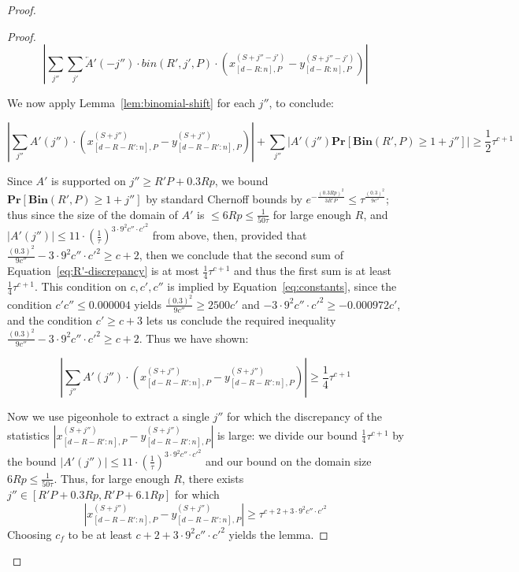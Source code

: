 \documentclass[11pt]{article}
\theoremstyle{plain}
\newcommand{\Bin}[2]{\textbf{Bin}(#1,#2)}
\renewcommand{\Pr}{\textbf{Pr}}
\begin{document}
\begin{proof}
\begin{proof}
    \[|\sum_{j''} \sum_{j'} \overleftarrow{A}'(-j'')\cdot bin(R',j',P)\cdot(x_{[d-R:n],P}^{(S+j''-j')}-y_{[d-R:n],P}^{(S+j''-j')})|\]

    We now apply Lemma~\ref{lem:binomial-shift} for each $j''$, to conclude:

    \begin{equation}\label{eq:R'-discrepancy}|\sum_{j''} A'(j'')\cdot (x_{[d-R-R':n],P}^{(S+j'')}-y_{[d-R-R':n],P}^{(S+j'')})|+\sum_{j''} |A'(j'')\Pr[\Bin{R'}{P}\geq 1+j'']|\geq \frac{1}{2}\tau^{c+1}\end{equation}

    

    Since $A'$ is supported on $j''\geq R'P+0.3Rp$, we bound $\Pr[\Bin{R'}{P}\geq 1+j'']$ by standard Chernoff bounds by $e^{-\frac{(0.3Rp)^2}{3R'P}}\leq \tau^{\frac{(0.3)^2}{9c''}}$; thus since the size of the domain of $A'$ is $\leq 6Rp\leq \frac{1}{50\tau}$ for large enough $R$, and $|A'(j'')|\leq 11\cdot (\frac{1}{\tau})^{3\cdot 9^2c''\cdot {c'}^2}$ from above, then, provided that $\frac{(0.3)^2}{9c''}-3\cdot 9^2c''\cdot {c'}^2 \geq c+2$, then we conclude that the second sum of Equation~\ref{eq:R'-discrepancy} is at most $\frac{1}{4}\tau^{c+1}$ and thus the first sum is at least $\frac{1}{4}\tau^{c+1}$. This condition on $c,c',c''$ is implied by Equation~\ref{eq:constants}, since the condition $c'c''\leq 0.000004$ yields $\frac{(0.3)^2}{9c''}\geq 2500c'$ and $-3\cdot 9^2c''\cdot {c'}^2\geq -0.000972c'$, and the condition $c'\geq c+3$ lets us conclude the required inequality $\frac{(0.3)^2}{9c''}-3\cdot 9^2c''\cdot {c'}^2 \geq c+2$. Thus we have shown:

    \[|\sum_{j''} A'(j'')\cdot (x_{[d-R-R':n],P}^{(S+j'')}-y_{[d-R-R':n],P}^{(S+j'')})|\geq \frac{1}{4}\tau^{c+1}\]

    Now we use pigeonhole to extract a single $j''$ for which the discrepancy of the statistics $|x_{[d-R-R':n],P}^{(S+j'')}-y_{[d-R-R':n],P}^{(S+j'')}|$ is large: we divide our bound $\frac{1}{4}\tau^{c+1}$ by the bound $|A'(j'')|\leq 11\cdot (\frac{1}{\tau})^{3\cdot 9^2c''\cdot {c'}^2}$ and our bound on the domain size $6Rp\leq \frac{1}{50\tau}$. Thus, for large enough $R$, there exists $j''\in [R'P+0.3Rp,R'P+6.1Rp]$ for which 
    \begin{equation}|x_{[d-R-R':n],P}^{(S+j'')}-y_{[d-R-R':n],P}^{(S+j'')}|\geq \tau^{c+2+3\cdot 9^2c''\cdot {c'}^2}\end{equation}
    Choosing $c_f$ to be at least $c+2+3\cdot 9^2c''\cdot {c'}^2$ yields the lemma.
\end{proof}




\end{proof}
\end{document}
